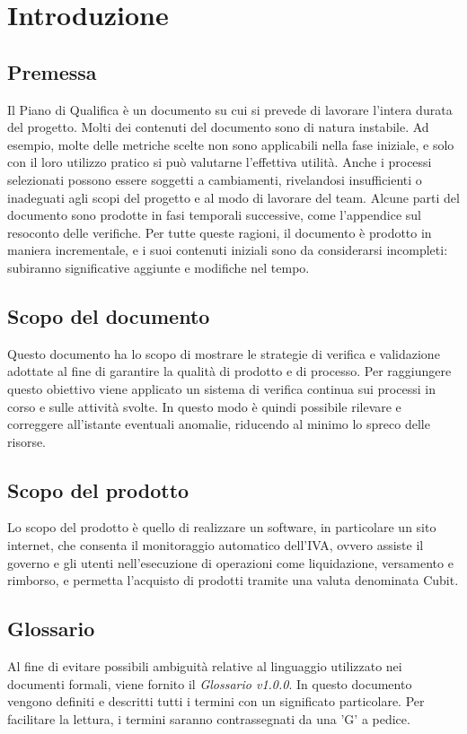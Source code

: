 \section{Introduzione}
\subsection{Premessa}
Il Piano di Qualifica è un documento su cui si prevede di lavorare l'intera durata del progetto.\newline 
Molti dei contenuti del documento sono di natura instabile. Ad esempio, molte delle metriche scelte non sono applicabili nella fase iniziale, e solo con il loro utilizzo pratico si può valutarne l'effettiva utilità. Anche i processi selezionati possono essere soggetti a cambiamenti, rivelandosi insufficienti o inadeguati agli scopi del progetto e al modo di lavorare del team.\newline 
Alcune parti del documento sono prodotte in fasi temporali successive, come l'appendice sul resoconto delle verifiche.\newline 
Per tutte queste ragioni, il documento è prodotto in maniera incrementale, e i suoi contenuti iniziali sono da considerarsi incompleti: subiranno significative aggiunte e modifiche nel tempo.
\subsection{Scopo del documento}
Questo documento ha lo scopo di mostrare le strategie di verifica e validazione adottate al fine di garantire la qualità di prodotto e di processo. Per raggiungere questo obiettivo viene applicato un sistema di verifica continua sui processi in corso e sulle attività svolte. In questo modo è quindi possibile rilevare e correggere all'istante eventuali anomalie, riducendo al minimo lo spreco delle risorse.
\subsection{Scopo del prodotto}
Lo scopo del prodotto è quello di realizzare un software, in particolare un sito internet, che consenta il monitoraggio automatico dell'IVA, ovvero assiste il governo e gli utenti nell'esecuzione di operazioni come liquidazione, versamento e rimborso, e permetta l'acquisto di prodotti tramite una valuta denominata Cubit\glo.
\subsection{Glossario}
Al fine di evitare possibili ambiguità relative al linguaggio utilizzato nei documenti formali, viene fornito il \textit{Glossario v1.0.0}. In questo documento vengono definiti e descritti tutti i termini con un significato particolare. Per facilitare la lettura, i termini saranno contrassegnati da una 'G' a pedice.
